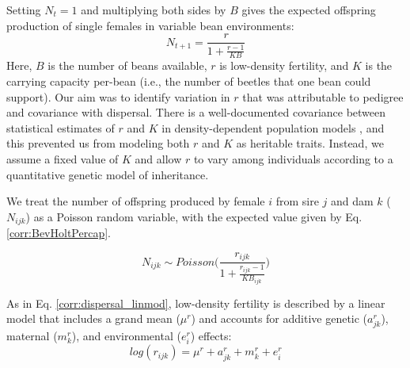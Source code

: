 \documentclass[11pt]{article}
\begin{document}
Setting $N_{t}=1$ and multiplying both sides by $B$ gives the expected offspring production of single females in variable bean environments:
%
\begin{equation}\label{corr:BevHoltPercap}
  N_{t+1} = \frac{r}{1 + \frac{r-1}{KB}}
\end{equation}
%
Here, $B$ is the number of beans available, $r$ is low-density fertility, and $K$ is the carrying capacity per-bean (i.e., the number of beetles that one bean could support).
Our aim was to identify variation in $r$ that was attributable to pedigree and covariance with dispersal.
There is a well-documented covariance between statistical estimates of $r$ and $K$ in density-dependent population models \citep{hilborn_quantitative_1992}, and this prevented us from modeling both $r$ and $K$ as heritable traits.
Instead, we assume a fixed value of $K$ and allow $r$ to vary among individuals according to a quantitative genetic model of inheritance.

We treat the number of offspring produced by female $i$ from sire $j$ and dam $k$ ($N_{ijk}$) as a Poisson random variable, with the expected value given by Eq. \ref{corr:BevHoltPercap}.

\begin{equation}\label{corr:Noff_ran}
  N_{ijk} \sim \mathit{Poisson}\Big(\frac{r_{ijk}} {1 + \frac{r_{ijk}-1}{KB_{ijk} }}\Big)
\end{equation}
%

As in Eq. \ref{corr:dispersal_linmod}, low-density fertility is described by a linear model that includes a grand mean ($\mu^{r}$) and accounts for additive genetic ($a^{r}_{jk}$), maternal ($m^{r}_{k}$), and environmental ($e^{r}_i$) effects:
%
\begin{equation} \label{corr:fert_linmod}
  log(r_{ijk}) = \mu^{r} + a^{r}_{jk} + m^{r}_{k} + e^{r}_{i}
\end{equation}
%
\end{document}
